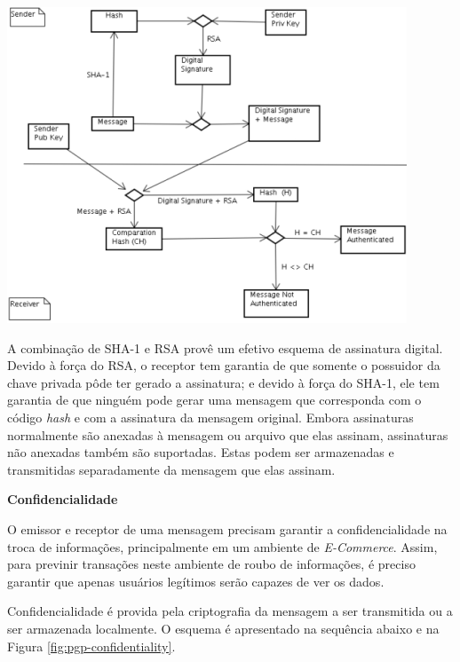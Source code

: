 \begin{center}
	\includegraphics[scale=0.8]{images/pgp-authentication.png}
	\label{fig:pgp-authentication}
\end{center}

A combinação de SHA-1 e RSA provê um efetivo esquema de assinatura digital. Devido à força do RSA, o receptor tem garantia de que somente o possuidor da chave privada pôde ter gerado a assinatura; e devido à força do SHA-1, ele tem garantia de que ninguém pode gerar uma mensagem que corresponda com o código \textit{hash} e com a assinatura da mensagem original. Embora assinaturas normalmente são anexadas à mensagem ou arquivo que elas assinam, assinaturas não anexadas também são suportadas. Estas podem ser armazenadas e transmitidas separadamente da mensagem que elas assinam.

\textbf{Confidencialidade}

O emissor e receptor de uma mensagem precisam garantir a confidencialidade na troca de informações, principalmente em um ambiente de \textit{E-Commerce}. Assim, para previnir transações neste ambiente de roubo de informações, é preciso garantir que apenas usuários legítimos serão capazes de ver os dados\cite{jiang2007line}.

Confidencialidade é provida pela criptografia da mensagem a ser transmitida ou a ser armazenada localmente. O esquema é apresentado na sequência abaixo e na Figura \ref{fig:pgp-confidentiality}.

